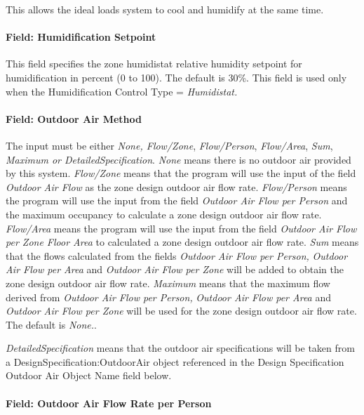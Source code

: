 This allows the ideal loads system to cool and humidify at the same time.

\paragraph{Field: Humidification Setpoint}\label{field-humidification-setpoint}

This field specifies the zone humidistat relative humidity setpoint for humidification in percent (0 to 100). The default is 30\%. This field is used only when the Humidification Control Type = \emph{Humidistat.}

\paragraph{Field: Outdoor Air Method}\label{field-outdoor-air-method-000}

The input must be either \emph{None, Flow/Zone}, \emph{Flow/Person}, \emph{Flow/Area}, \emph{Sum}, \emph{Maximum or DetailedSpecification}. \emph{None} means there is no outdoor air provided by this system. \emph{Flow/Zone} means that the program will use the input of the field \emph{Outdoor Air Flow} as the zone design outdoor air flow rate. \emph{Flow/Person} means the program will use the input from the field \emph{Outdoor Air Flow per Person} and the maximum occupancy to calculate a zone design outdoor air flow rate. \emph{Flow/Area} means the program will use the input from the field \emph{Outdoor Air Flow per Zone Floor Area} to calculated a zone design outdoor air flow rate. \emph{Sum} means that the flows calculated from the fields \emph{Outdoor Air Flow per Person,} \emph{Outdoor Air Flow per Area} and \emph{Outdoor Air Flow per Zone} will be added to obtain the zone design outdoor air flow rate. \emph{Maximum} means that the maximum flow derived from \emph{Outdoor Air Flow per Person,} \emph{Outdoor Air Flow per Area} and \emph{Outdoor Air Flow per Zone} will be used for the zone design outdoor air flow rate. The default is \emph{None.}.

\emph{DetailedSpecification} means that the outdoor air specifications will be taken from a DesignSpecification:OutdoorAir object referenced in the Design Specification Outdoor Air Object Name field below.

\paragraph{Field: Outdoor Air Flow Rate per Person}\label{field-outdoor-air-flow-rate-per-person}

